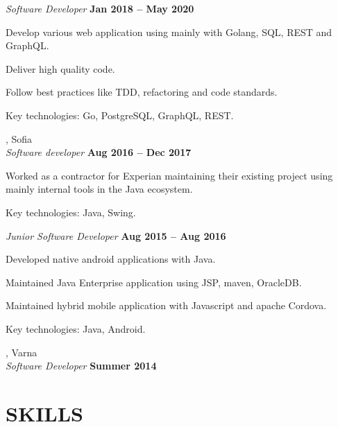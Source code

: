 \documentclass[margin,line]{resume}
\begin{document}
\begin{resume}
    \textsl{Software Developer} \hfill \textbf{Jan 2018 {--} May 2020}\
    \begin{list2}
        \item Develop various web application using mainly with
          Golang, SQL, REST and GraphQL.
		\item Deliver high quality code.\@
        \item Follow best practices like TDD, refactoring and code standards.\@
		\item Key technologies: Go, PostgreSQL, GraphQL, REST.
    \end{list2}

    \textbf{}, Sofia \vspace{2mm}\\\vspace{1mm}%
    \textsl{Software developer} \hfill \textbf{Aug 2016 {--} Dec 2017}\
    \begin{list2}
        \item Worked as a contractor for Experian maintaining their
          existing project using mainly internal tools in the Java
          ecosystem.
		\item Key technologies: Java, Swing.
    \end{list2}

    \textsl{Junior Software Developer} \hfill \textbf{Aug 2015 {--} Aug 2016}\
    \begin{list2}
        \item Developed native android applications with Java.
		\item Maintained Java Enterprise application using JSP, maven, OracleDB.\@
        \item Maintained hybrid mobile application with Javascript and apache Cordova.
		\item Key technologies: Java, Android.
    \end{list2}

    \textbf{}, Varna \vspace{2mm}\\\vspace{1mm}%
    \textsl{Software Developer} \hfill \textbf{Summer 2014}

\pagebreak

\sectionline%

\section{\mysidestyle\textbf{\large{S}\small{KILLS}}}


\end{resume}
\end{document}
